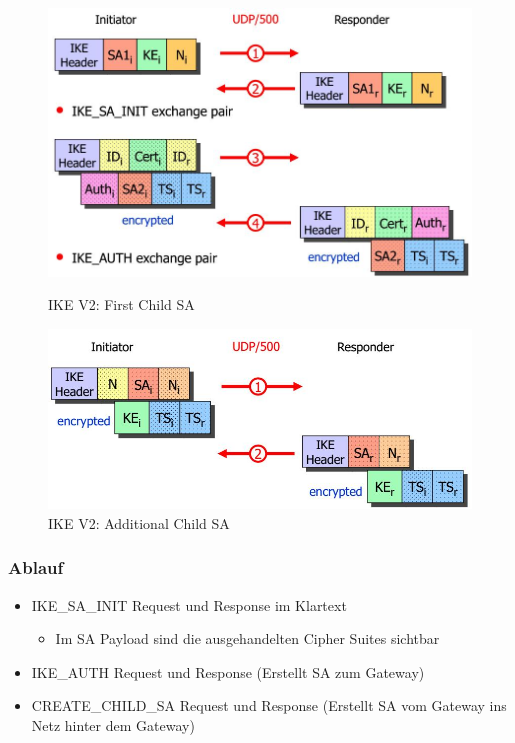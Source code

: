 \begin{figure}[ht!]
	\centering
	\begin{minipage}[t]{0.4\textwidth}
		\centering
		\includegraphics[width=\linewidth]{images/ike_v2}
		\caption{IKE V2: First Child SA}
		\label{fig:ikev2}
	\end{minipage}
	\begin{minipage}[t]{0.4\textwidth}
		\centering
		\includegraphics[width=\linewidth]{images/ike_v2_additional_sa}
		\caption{IKE V2: Additional Child SA}
		\label{fig:ikev2additionalsa}
	\end{minipage}
\end{figure}

\subsubsection{Ablauf}
\begin{itemize}
	\item IKE\_SA\_INIT Request und Response im Klartext
	\begin{itemize}
		\item Im SA Payload sind die ausgehandelten Cipher Suites sichtbar
	\end{itemize}
	\item IKE\_AUTH Request und Response (Erstellt SA zum Gateway)
	\item CREATE\_CHILD\_SA Request und Response (Erstellt SA vom Gateway ins Netz hinter dem Gateway)
\end{itemize}

